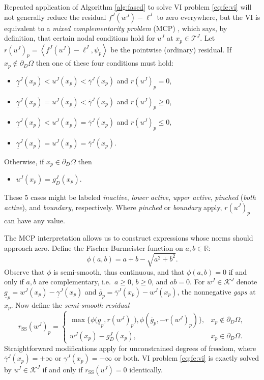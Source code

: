 \documentclass[review,hidelinks,onefignum,onetabnum]{siamart220329}
\newcommand{\RR}{\mathbb{R}}
\newcommand{\cK}{\mathcal{K}}
\newcommand{\ip}[2]{\left<#1,#2\right>}
\newcommand{\rSS}{r_{\text{SS}}}
\begin{document}
Repeated application of Algorithm \ref{alg:fascd} to solve VI problem \eqref{eq:fe:vi} will not generally reduce the residual $f^J(w^J) - \ell^J$ to zero everywhere, but the VI is equivalent to a \emph{mixed complementarity problem} (MCP) \cite{FacchineiPang2003}, which says, by definition, that certain nodal conditions hold for $u^J$ at $x_p \in \mathcal{T}^J$.  Let $r(u^J)_p = \ip{f^J(u^J)-\ell^J}{\psi_p}$ be the pointwise (ordinary) residual.  If $x_p \notin \partial_D\Omega$ then one of these four conditions must hold:
\begin{itemize}
\item $\underline{\gamma}^J(x_p)<u^J(x_p)<\overline{\gamma}^J(x_p)$ and $r(u^J)_p = 0$,
\item $\underline{\gamma}^J(x_p)=u^J(x_p)<\overline{\gamma}^J(x_p)$ and $r(u^J)_p \ge 0$,
\item $\underline{\gamma}^J(x_p)<u^J(x_p)=\overline{\gamma}^J(x_p)$ and $r(u^J)_p \le 0$,
\item $\underline{\gamma}^J(x_p)=u^J(x_p)=\overline{\gamma}^J(x_p)$.
\end{itemize}
Otherwise, if $x_p \in \partial_D\Omega$ then
\begin{itemize}
\item $u^J(x_p)=g_D^J(x_p)$.
\end{itemize}
These 5 cases might be labeled \emph{inactive}, \emph{lower active}, \emph{upper active}, \emph{pinched} (\emph{both active}), and \emph{boundary}, respectively.  Where \emph{pinched} or \emph{boundary} apply, $r(u^J)_p$ can have any value.

The MCP interpretation allows us to construct expressions whose norms should approach zero.  Define the Fischer-Burmeister function \cite{BensonMunson2006,Ulbrich2011} on $a,b\in\RR$:
\begin{equation}
\phi(a,b) = a + b - \sqrt{a^2 + b^2}. \label{eq:phiFB}
\end{equation}
Observe that $\phi$ is semi-smooth, thus continuous, and that $\phi(a,b)=0$ if and only if $a,b$ are complementary, i.e.~$a\ge 0$, $b\ge 0$, and $ab=0$.  For $w^J\in \mathcal{K}^J$ denote $\underline{g}_p = w^J(x_p) - \underline{\gamma}^J(x_p)$ and $\overline{g}_p = \overline{\gamma}^J(x_p) - w^J(x_p)$, the nonnegative \emph{gaps} at $x_p$.  Now define the \emph{semi-smooth residual}
\begin{equation}
\rSS(w^J)_p = \begin{cases}
\max\big\{\phi\big(\underline{g}_p, r(w^J)_p\big), \phi\left(\overline{g}_p, -r(w^J)_p\right)\big\}, & x_p \notin \partial_D\Omega, \\
w^J(x_p) - g_D^J(x_p), & x_p \in \partial_D\Omega.
\end{cases} \label{eq:rSS}
\end{equation}
Straightforward modifications apply for unconstrained degrees of freedom, where $\overline{\gamma}^J(x_p) = +\infty$ or $\underline{\gamma}^J(x_p) = -\infty$ or both.  VI problem \eqref{eq:fe:vi} is exactly solved by $u^J\in\cK^J$ if and only if $\rSS(u^J)=0$ identically.
\end{document}
